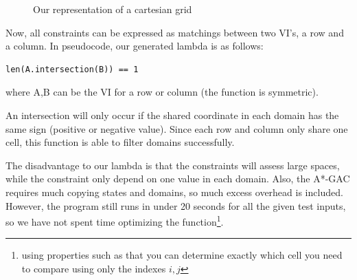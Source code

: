 \documentclass[journal]{IEEEtran}
\begin{document}
\begin{figure}[Hb]
\centering
    \caption{Our representation of a cartesian grid}
\label{fig:grid}
\end{figure}

Now, all constraints can be expressed as matchings between two VI's,
a row and a column. In pseudocode, our generated lambda is as follows:
\begin{verbatim}
len(A.intersection(B)) == 1
\end{verbatim}

where A,B can be the VI for a row or column (the function is symmetric).

An intersection will only occur if the shared coordinate in each domain has the same
sign (positive or negative value). Since each row and column only share one cell,
this function is able to filter domains successfully.

The disadvantage to our lambda is that the constraints will assess large spaces,
while the constraint only depend on one value in each domain. Also,
the A*-GAC requires much copying states and domains, so much excess overhead
is included. However, the program still runs in under 20 seconds for all 
the given test inputs, so we have not spent time optimizing the function\footnote{
    using properties such as that you can determine exactly which cell you need
to compare using only the indexes $i,j$}.

%
\end{document}
